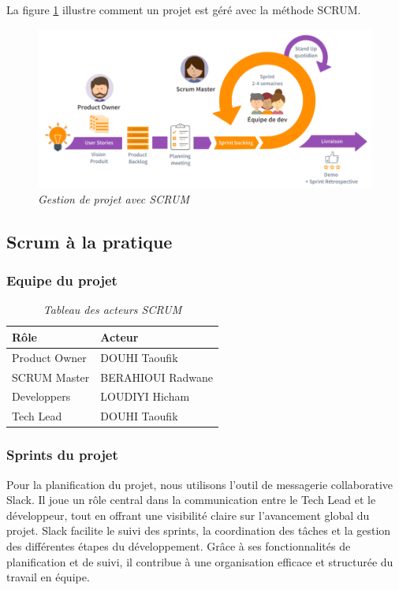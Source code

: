 \documentclass[12pt,a4paper]{report}
\begin{document}
	La figure \ref{fig:scrum} illustre comment un projet est géré avec la méthode SCRUM.
	
	\begin{figure}[H]
		\centering
		\includegraphics[width=1\textwidth]{scrum.png}
		\caption{\textit{Gestion de projet avec SCRUM}}
		\label{fig:scrum}
	\end{figure}
	
	\subsection{Scrum à la pratique}
	
	\subsubsection{Equipe du projet}
	
	\begin{table}[H]
		\centering
		\caption{\textit{Tableau des acteurs SCRUM}}
		\begin{tabular}{|l|l|}
			\hline
			\textbf{Rôle} & \textbf{Acteur} \\
			\hline
			Product Owner & DOUHI Taoufik \\
			\hline
			SCRUM Master & BERAHIOUI Radwane \\
			\hline
			Developpers & LOUDIYI Hicham \\
			\hline
			Tech Lead & DOUHI Taoufik \\
			\hline
		\end{tabular}
		\label{tab:equipe-projet}
	\end{table}
	
	\subsubsection{Sprints du projet}
	
	Pour la planification du projet, nous utilisons l’outil de messagerie collaborative Slack. Il joue un rôle central dans la communication entre le Tech Lead et le développeur, tout en offrant une visibilité claire sur l’avancement global du projet. Slack facilite le suivi des sprints, la coordination des tâches et la gestion des différentes étapes du développement. Grâce à ses fonctionnalités de planification et de suivi, il contribue à une organisation efficace et structurée du travail en équipe.
	
\end{document}
